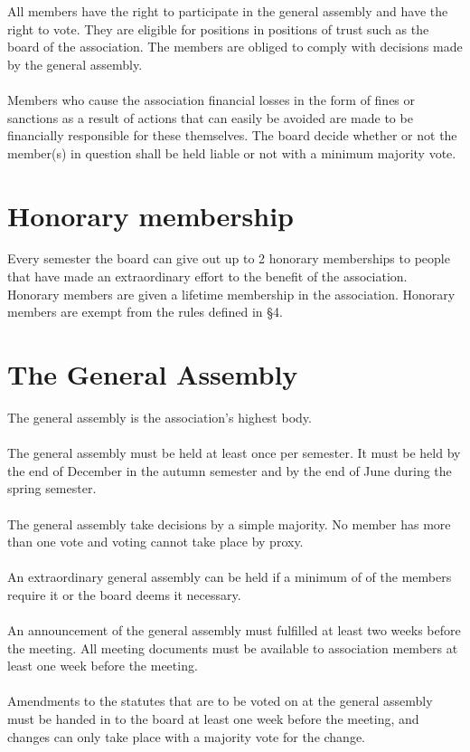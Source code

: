 \documentclass[12pt,a4paper,norsk]{article}
\begin{document}
All members have the right to participate in the general assembly and have the right to vote. They are eligible for positions in positions of trust such as the board of the association. The members are obliged to comply with decisions made by the general assembly.
\\
\\
Members who cause the association financial losses in the form of fines or sanctions as a result of actions that can easily be avoided are made to be financially responsible for these themselves. The board decide whether or not the member(s) in question shall be held liable or not with a minimum  majority vote.


\section{Honorary membership}

Every semester the board can give out up to 2 honorary memberships to people that have made an extraordinary effort to the benefit of the association. Honorary members are given a lifetime membership in the association. Honorary members are exempt from the rules defined in §4.



\section{The General Assembly}

The general assembly is the association's highest body.
\\
\\
The general assembly must be held at least once per semester. It must be held by the end of December in the autumn semester and by the end of June during the spring semester.
\\
\\
The general assembly take decisions by a simple majority. No member has more than one vote and voting cannot take place by proxy.
\\
\\
An extraordinary general assembly can be held if a minimum of  of the members require it
or the board deems it necessary.
\\
\\
An announcement of the general assembly must fulfilled at least two weeks before
the meeting. All meeting documents must be available to association members at least one week before the meeting.
\\
\\
Amendments to the statutes that are to be voted on at the general assembly must be handed in to the board
at least one week before the meeting, and changes can only take place with a  majority vote for the change.
\end{document}
